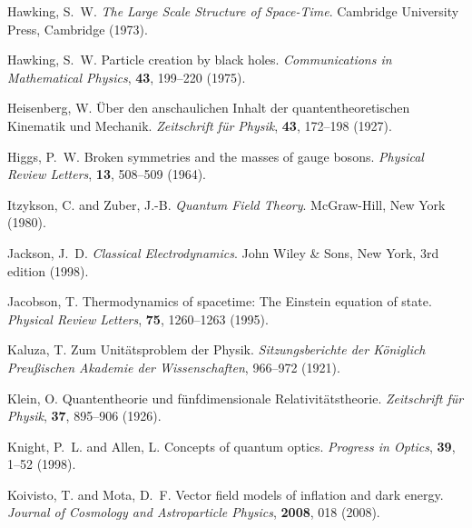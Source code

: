 \documentclass[12pt,a4paper]{article}
\begin{document}
\begin{thebibliography}{99}
		Hawking, S.~W.
		\newblock \textit{The Large Scale Structure of Space-Time}.
		\newblock Cambridge University Press, Cambridge (1973).
		
		Hawking, S.~W.
		\newblock Particle creation by black holes.
		\newblock \textit{Communications in Mathematical Physics}, \textbf{43}, 199--220 (1975).
		\newblock {}
		
		Heisenberg, W.
		\newblock Über den anschaulichen Inhalt der quantentheoretischen Kinematik und Mechanik.
		\newblock \textit{Zeitschrift für Physik}, \textbf{43}, 172--198 (1927).
		\newblock {}
		
		Higgs, P.~W.
		\newblock Broken symmetries and the masses of gauge bosons.
		\newblock \textit{Physical Review Letters}, \textbf{13}, 508--509 (1964).
		\newblock {}
		
		Itzykson, C. and Zuber, J.-B.
		\newblock \textit{Quantum Field Theory}.
		\newblock McGraw-Hill, New York (1980).
		
		Jackson, J.~D.
		\newblock \textit{Classical Electrodynamics}.
		\newblock John Wiley \& Sons, New York, 3rd edition (1998).
		
		Jacobson, T.
		\newblock Thermodynamics of spacetime: The Einstein equation of state.
		\newblock \textit{Physical Review Letters}, \textbf{75}, 1260--1263 (1995).
		\newblock {}
		
		Kaluza, T.
		\newblock Zum Unitätsproblem der Physik.
		\newblock \textit{Sitzungsberichte der Königlich Preußischen Akademie der Wissenschaften}, 966--972 (1921).
		
		Klein, O.
		\newblock Quantentheorie und fünfdimensionale Relativitätstheorie.
		\newblock \textit{Zeitschrift für Physik}, \textbf{37}, 895--906 (1926).
		\newblock {}
		
		Knight, P.~L. and Allen, L.
		\newblock Concepts of quantum optics.
		\newblock \textit{Progress in Optics}, \textbf{39}, 1--52 (1998).
		\newblock {}
		
		Koivisto, T. and Mota, D.~F.
		\newblock Vector field models of inflation and dark energy.
		\newblock \textit{Journal of Cosmology and Astroparticle Physics}, \textbf{2008}, 018 (2008).
		\newblock {}
		

\end{thebibliography}
\end{document}
